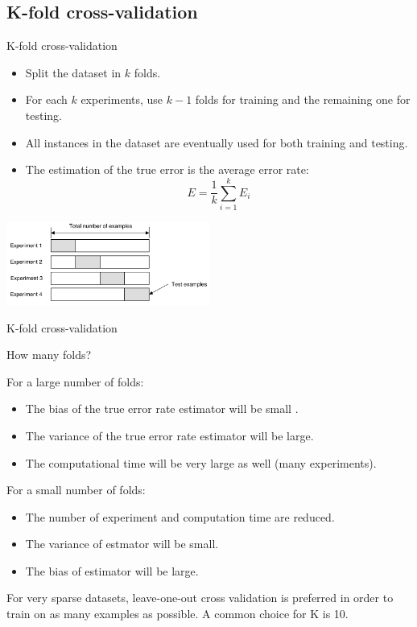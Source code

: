 \documentclass[aspectratio=169,compress,10pt]{beamer}
\begin{document}
\subsection{K-fold cross-validation}
\begin{frame}{K-fold cross-validation}
\begin{itemize}
	\item Split the dataset in $k$ folds.
	\item For each $k$ experiments, use $k-1$ folds for training and the remaining one for testing.
	\item All instances in the dataset are eventually used for both training and testing.
	\item The estimation of the true error is the average error rate:
$$
	E = \frac{1}{k} \sum_{i=1}^k E_{i}
$$
\end{itemize}
\centering{}
\includegraphics[width=0.5\textwidth]{../report/resources/images/k-fold}
\end{frame}


\begin{frame}{K-fold cross-validation}

{\Large{} How many folds?} 

For a large number of folds:
\begin{itemize}
	\item \checkmark The bias of the true error rate estimator will be small .
	\item \texttimes The variance of the true error rate estimator will be large.
	\item \texttimes The computational time will be very large as well (many experiments).
\end{itemize}

For a small number of folds:
\begin{itemize}
	\item \checkmark The number of experiment and computation time are reduced.
	\item \checkmark The variance of estmator will be small.
	\item \texttimes The bias of estimator will be large.
\end{itemize}

For very sparse datasets, leave-one-out cross validation is preferred in order to train on as many examples as possible.
A common choice for K is 10.
\end{frame}
\end{document}
